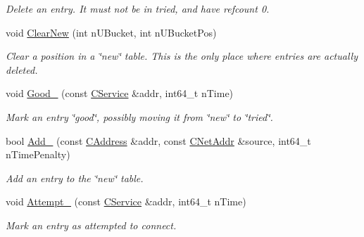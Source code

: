 \begin{DoxyCompactItemize}
\begin{DoxyCompactList}\small\item\em Delete an entry. It must not be in tried, and have refcount 0. \end{DoxyCompactList}\item 
\mbox{\label{class_c_addr_man_ab283de3e750f006c85573976bd40da81}} 
void \mbox{\hyperlink{class_c_addr_man_ab283de3e750f006c85573976bd40da81}{Clear\+New}} (int n\+U\+Bucket, int n\+U\+Bucket\+Pos)
\begin{DoxyCompactList}\small\item\em Clear a position in a \char`\"{}new\char`\"{} table. This is the only place where entries are actually deleted. \end{DoxyCompactList}\item 
\mbox{\label{class_c_addr_man_a33ec6a4584cf4b17af821e6e35216459}} 
void \mbox{\hyperlink{class_c_addr_man_a33ec6a4584cf4b17af821e6e35216459}{Good\+\_\+}} (const \mbox{\hyperlink{class_c_service}{C\+Service}} \&addr, int64\+\_\+t n\+Time)
\begin{DoxyCompactList}\small\item\em Mark an entry \char`\"{}good\char`\"{}, possibly moving it from \char`\"{}new\char`\"{} to \char`\"{}tried\char`\"{}. \end{DoxyCompactList}\item 
\mbox{\label{class_c_addr_man_a9dd6df8b1904548a86054d19d4a90724}} 
bool \mbox{\hyperlink{class_c_addr_man_a9dd6df8b1904548a86054d19d4a90724}{Add\+\_\+}} (const \mbox{\hyperlink{class_c_address}{C\+Address}} \&addr, const \mbox{\hyperlink{class_c_net_addr}{C\+Net\+Addr}} \&source, int64\+\_\+t n\+Time\+Penalty)
\begin{DoxyCompactList}\small\item\em Add an entry to the \char`\"{}new\char`\"{} table. \end{DoxyCompactList}\item 
\mbox{\label{class_c_addr_man_ab1a1bfa8b435ef139570c88de1a5245f}} 
void \mbox{\hyperlink{class_c_addr_man_ab1a1bfa8b435ef139570c88de1a5245f}{Attempt\+\_\+}} (const \mbox{\hyperlink{class_c_service}{C\+Service}} \&addr, int64\+\_\+t n\+Time)
\begin{DoxyCompactList}\small\item\em Mark an entry as attempted to connect. \end{DoxyCompactList}\item 

\end{DoxyCompactItemize}
